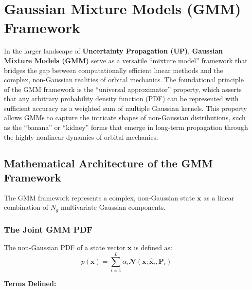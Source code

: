\documentclass[
  letterpaper,
  DIV=11,
  numbers=noendperiod,
  oneside]{scrartcl}
\begin{document}
\section{Gaussian Mixture Models (GMM)
Framework}\label{gaussian-mixture-models-gmm-framework}

In the larger landscape of \textbf{Uncertainty Propagation (UP)},
\textbf{Gaussian Mixture Models (GMM)} serve as a versatile ``mixture
model'' framework that bridges the gap between computationally efficient
linear methods and the complex, non-Gaussian realities of orbital
mechanics. The foundational principle of the GMM framework is the
``universal approximator'' property, which asserts that any arbitrary
probability density function (PDF) can be represented with sufficient
accuracy as a weighted sum of multiple Gaussian kernels. This property
allows GMMs to capture the intricate shapes of non-Gaussian
distributions, such as the ``banana'' or ``kidney'' forms that emerge in
long-term propagation through the highly nonlinear dynamics of orbital
mechanics.

\subsection{Mathematical Architecture of the GMM
Framework}\label{mathematical-architecture-of-the-gmm-framework}

The GMM framework represents a complex, non-Gaussian state
\(\mathbf{x}\) as a linear combination of \(N_g\) multivariate Gaussian
components.

\subsubsection{The Joint GMM PDF}\label{the-joint-gmm-pdf}

The non-Gaussian PDF of a state vector \(\mathbf{x}\) is defined as: \[
p(\mathbf{x}) = \sum_{i=1}^{L} \alpha_i \mathbfcal{N}(\mathbf{x}; \hat{\mathbf{x}}_i, \mathbf{P}_i)
\]

\textbf{Terms Defined:}
\end{document}
